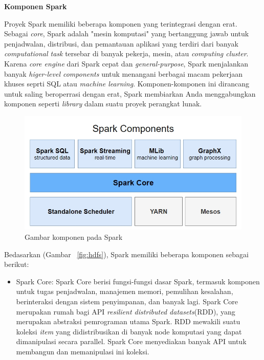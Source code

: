\documentclass[a4paper,twoside]{article}
\begin{document}
\begin{enumerate}
\textbf{Komponen Spark}


Proyek Spark memiliki beberapa komponen yang terintegrasi dengan erat. Sebagai {\it core}, Spark adalah "mesin komputasi" yang bertanggung jawab untuk penjadwalan, distribusi, dan pemantauan aplikasi yang terdiri dari banyak {\it computational task} tersebar di banyak pekerja, mesin, atau {\it computing cluster}. Karena {\it core engine} dari Spark cepat dan {\it general-purpose}, Spark menjalankan banyak {\it higer-level components} untuk menangani berbagai macam pekerjaan khuses seprti SQL atau {\it machine learning}. Komponen-komponen ini dirancang untuk saling beroperrasi dengan erat, Spark membiarkan Anda menggabungkan komponen seperti {\it library} dalam suatu proyek perangkat lunak.\\

\begin{figure}[H]
    \centering  
    \includegraphics[scale=0.62]{sparkcomponent}  
    \caption[Gambar komponen pada Spark]{Gambar komponen pada Spark} 
    \label{fig:sparkcomponent} 
\end{figure}

Bedasarkan (Gambar ~\ref{fig:hdfs}), Spark memiliki beberapa komponen sebagai berikut:

\begin{itemize}

\item Spark Core:
Spark Core berisi fungsi-fungsi dasar Spark, termasuk komponen untuk tugas penjadwalan, manajemen memori, pemulihan kesalahan, berinteraksi dengan sistem penyimpanan,
dan banyak lagi. Spark Core merupakan rumah bagi API \textit{resilient distributed datasets}(RDD), yang merupakan abstraksi pemrograman utama Spark. RDD mewakili suatu
koleksi \textit{item} yang didistribusikan di banyak node komputasi yang dapat dimanipulasi
secara parallel. Spark Core menyediakan banyak API untuk membangun dan memanipulasi ini
koleksi. 


\end{itemize}
\end{enumerate}
\end{document}
